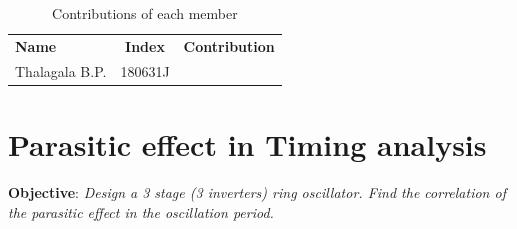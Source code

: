 \documentclass[a4paper,11pt]{article}%
\begin{document}

\pagebreak

\begin{table}[!h]
		\centering
		\begin{tabular}{l c l}
		\textbf{Name} & \textbf{Index} & \textbf{Contribution}\\
	Thalagala B.P. & 180631J & \\
		\end{tabular}
		\caption{Contributions of each member}
\end{table}


%
%
%
%
%
%
%
%
%
%
%
%
%
%





\tableofcontents

\pagebreak
\section{Parasitic effect in Timing analysis}
\textbf{Objective}: \textit{Design a 3 stage (3 inverters) ring oscillator. Find the correlation of the parasitic effect in the oscillation period.}\\
\end{document}
